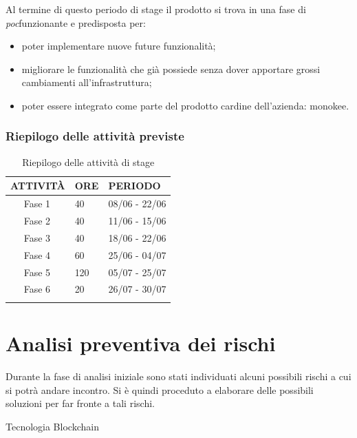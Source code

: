 Al termine di questo periodo di stage il prodotto si trova in una fase di \emph{\gls{poc}}\glsfirstoccur funzionante e predisposta per:
\begin{itemize}
	\item poter implementare nuove future funzionalità;
	\item migliorare le funzionalità che già possiede senza dover apportare grossi cambiamenti all'infrastruttura;
	\item poter essere integrato come parte del prodotto cardine dell'azienda: \gls{monokee}.
\end{itemize}

\subsubsection{Riepilogo delle attività previste}
\begin{longtable}{|r l|p{1cm}|p{3cm}|}
	\hline
	\multicolumn{2}{|c|}{\textbf{ATTIVITÀ}} & \textbf{ORE} & \textbf{PERIODO}\tabularnewline
	\hline
	& Fase 1 & 40 & 08/06 - 22/06 \\\hline	
	& Fase 2 & 40 & 11/06 - 15/06\\\hline
	& Fase 3 & 40 & 18/06 - 22/06\\\hline
	& Fase 4 & 60 & 25/06 - 04/07 \\\hline
	& Fase 5 & 120 & 05/07 - 25/07 \\\hline
	& Fase 6 & 20 & 26/07 - 30/07 \\\hline	
	\caption{Riepilogo delle attività di stage}
\end{longtable}

\section{Analisi preventiva dei rischi}

Durante la fase di analisi iniziale sono stati individuati alcuni possibili rischi a cui si potrà andare incontro.
Si è quindi proceduto a elaborare delle possibili soluzioni per far fronte a tali rischi.\\

\begin{risk}{Tecnologia Blockchain}
	\label{risk:new-technology}
\end{risk}


